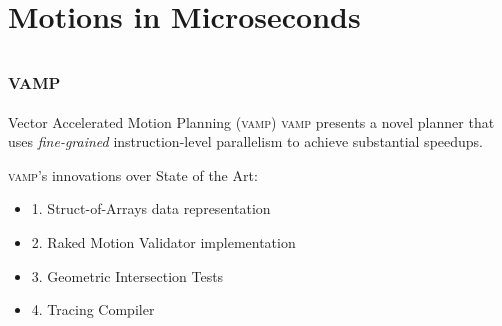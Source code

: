\documentclass{beamer}
\begin{document}
\section{Motions in Microseconds}

\subsection{\textsc{vamp}}


%
%

\begin{frame}{Vector Accelerated Motion Planning (\textsc{vamp})}
\textsc{vamp} presents a novel planner that uses \textit{fine-grained} instruction-level parallelism to achieve substantial speedups.

\vspace{10px}

\pause
\textsc{vamp}'s innovations over State of the Art:
\begin{itemize}
\item 1. Struct-of-Arrays data representation
\item 2. Raked Motion Validator implementation
\item 3. Geometric Intersection Tests
\item 4. Tracing Compiler
\end{itemize}
\end{frame}
\end{document}
